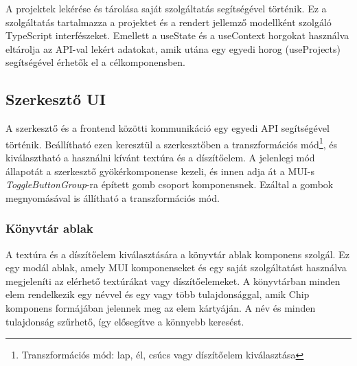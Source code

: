 A projektek lekérése és tárolása saját szolgáltatás segítségével történik. Ez a szolgáltatás tartalmazza a projektet és a rendert jellemző modellként szolgáló TypeScript interfészeket. Emellett a useState és a useContext horgokat használva eltárolja az API-val lekért adatokat, amik utána egy egyedi horog (useProjects) segítségével érhetők el a célkomponensben.

\subsection{Szerkesztő UI}
A szerkesztő és a frontend közötti kommunikáció egy egyedi API segítségével történik. Beállítható ezen keresztül a szerkesztőben a transzformációs mód\footnote{Transzformációs mód: lap, él, csúcs vagy díszítőelem kiválasztása}, és kiválasztható a használni kívánt textúra és a díszítőelem. A jelenlegi mód állapotát a szerkesztő gyökérkomponense kezeli, és innen adja át a MUI-s \emph{ToggleButtonGroup}-ra épített gomb csoport komponensnek. Ezáltal a gombok megnyomásával is állítható a transzformációs mód.

\subsubsection{Könyvtár ablak}
A textúra és a díszítőelem kiválasztására a könyvtár ablak komponens szolgál. Ez egy modál ablak, amely MUI komponenseket és egy saját szolgáltatást használva megjeleníti az elérhető textúrákat vagy díszítőelemeket. A könyvtárban minden elem rendelkezik egy névvel és egy vagy több tulajdonsággal, amik Chip komponens formájában jelennek meg az elem kártyáján. A név és minden tulajdonság szűrhető, így elősegítve a könnyebb keresést.


